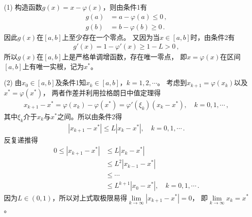 \begin{prove}
    (1) 构造函数$g(x)=x-\varphi(x)$，则由条件1有
    \begin{align}\label{eq:02ex0312}
        g(a) & =a-\varphi(a)\le0\, , \\
        g(b) & =b-\varphi(b)\ge0\, .
    \end{align}
    因此$g(x)$在$[a,b]$上至少存在一个零点。
    又因为当$x\in[a,b]$时，由条件2有
    \begin{align}\label{eq:02ex0313}
        g'(x)=1-\varphi'(x)\ge1-L>0\, ,
    \end{align}
    所以$g(x)$在$[a,b]$上是严格单调增函数，存在唯一零点，
    即$x=\varphi(x)$在区间$[a,b]$上有唯一实根，记为$x^*$。

    (2) 由$x_0\in[a,b]$及条件1知$x_k\in[a,b]$，$k=1,2,\cdots$。
    考虑到$x_{k+1}=\varphi(x_k)$以及$x^*=\varphi(x^*)$，
    两者作差并利用拉格朗日中值定理得
    \begin{align}\label{eq:02ex0314}
        x_{k+1}-x^*=\varphi(x_k)-\varphi(x^*)=\varphi'(\xi_k)(x_k-x^*),\quad k=0,1,\cdots\, ,
    \end{align}
    其中$\xi_k$介于$x_k$与$x^*$之间。所以由条件2得
    \begin{align}\label{eq:02ex0314.5}
        |x_{k+1}-x^*|\le L|x_k-x^*|,\quad k=0,1,\cdots\, .
    \end{align}
    反复递推得
    \begin{align}\label{eq:02ex0315}
        0\le|x_{k+1}-x^*| & \le L|x_k-x^*|\nonumber                     \\
                          & \le L^2|x_{k-1}-x^*|\nonumber               \\
                          & \le\cdots\nonumber                          \\
                          & \le L^{k+1}|x_0-x^*|,\quad k=0,1,\cdots\, .
    \end{align}
    因为$L\in(0,1)$，所以对上式取极限易得$\displaystyle\lim\limits_{k\rightarrow\infty}{|x_{k+1}-x^*|}=0$，
    即$\displaystyle\lim\limits_{k\rightarrow\infty}{x_k}=x^*$。


\end{prove}
